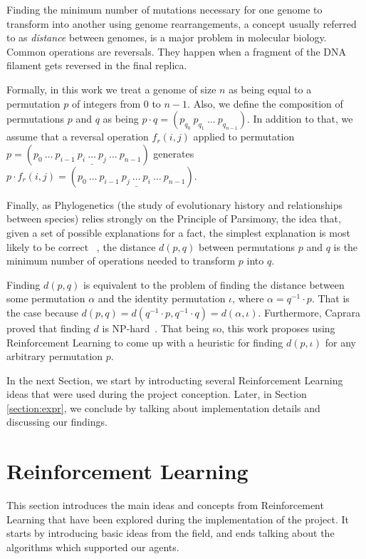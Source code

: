 \documentclass[11pt,twoside]{article}
\begin{document}
Finding the minimum number of mutations necessary for one genome to transform into another using genome rearrangements, a concept usually referred to as \textit{distance} between genomes, is a major problem in molecular biology. Common operations are reversals. They happen when a fragment of the DNA filament gets reversed in the final replica. 

Formally, in this work we treat a genome of size $n$ as being equal to a permutation $p$ of integers from $0$ to $n - 1$. Also, we define the composition of permutations $p$ and $q$ as being $p \cdot q = (p_{q_0}\ p_{q_1}\ \ldots\ p_{q_{n-1}})$. In addition to that, we assume that a reversal operation $f_r(i,j)$ applied to permutation $p = (p_0\ \ldots\ p_{i-1}\ \underline{p_{i}\ \ldots\ p_{j}}\ \ldots\ p_{n-1})$ generates $p \cdot f_r(i,j) = (p_0\ \ldots\ p_{i-1}\ \underline{p_{j}\ \ldots\ p_{i}}\ \ldots\ p_{n-1})$.

Finally, as Phylogenetics (the study of evolutionary history and relationships between species) relies strongly on the Principle of Parsimony, the idea that, given a set of possible explanations for a fact, the simplest explanation is most likely to be correct ~\cite{parsimony}, the distance $d(p, q)$ between permutations $p$ and $q$ is the minimum number of operations needed to transform $p$ into $q$. 

Finding $d(p, q)$ is equivalent to the problem of finding the distance between some permutation $\alpha$ and the identity permutation $\iota$, where $\alpha = q^{-1} \cdot p$. That is the case because $d(p, q) = d(q^{-1} \cdot p, q^{-1} \cdot q) = d(\alpha, \iota)$. Furthermore, Caprara proved that finding $d$ is NP-hard~\cite{caprara1999sorting}. That being so, this work proposes using Reinforcement Learning to come up with a heuristic for finding $d(p, \iota)$ for any arbitrary permutation $p$.

In the next Section, we start by introducting several Reinforcement Learning ideas that were used during the project conception. Later, in Section \ref{section:expr}, we conclude by talking about implementation details and discussing our findings.

\section{Reinforcement Learning}

This section introduces the main ideas and concepts from Reinforcement Learning that have been explored during the implementation of the project. It starts by introducing basic ideas from the field, and ends talking about the algorithms which supported our agents.
\end{document}
